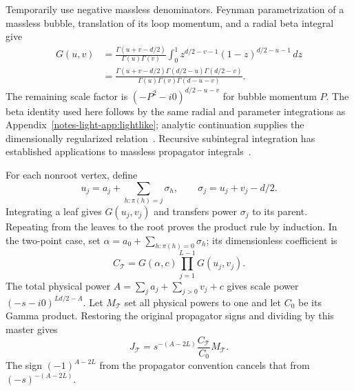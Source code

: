 \documentclass[11pt,a4paper]{article}
\begin{document}
Temporarily use negative massless denominators. Feynman parametrization of a massless bubble, translation of its loop momentum, and a radial beta integral give
\begin{align}
 G(u,v)&=\frac{\Gamma(u+v-d/2)}{\Gamma(u)\Gamma(v)}
 \int_0^1z^{d/2-v-1}(1-z)^{d/2-u-1}\,dz\nonumber\\
 &=\frac{\Gamma(u+v-d/2)\Gamma(d/2-u)\Gamma(d/2-v)}
 {\Gamma(u)\Gamma(v)\Gamma(d-u-v)}.
 \label{notes-direct-eq:tree-bubble}
\end{align}
The remaining scale factor is $(-P^2-i0)^{d/2-u-v}$ for bubble momentum $P$. The beta identity used here follows by the same radial and parameter integrations as Appendix~\ref{notes-light-app:lightlike}; analytic continuation supplies the dimensionally regularized relation~\cite{Weinzierl2022}. Recursive subintegral integration has established applications to massless propagator integrals~\cite{Ruijl2017Forcer}.

For each nonroot vertex, define
\begin{equation}
 u_j=a_j+\sum_{h:\pi(h)=j}\sigma_h,\qquad
 \sigma_j=u_j+v_j-d/2.
 \label{notes-direct-eq:tree-transfer}
\end{equation}
Integrating a leaf gives $G(u_j,v_j)$ and transfers power $\sigma_j$ to its parent. Repeating from the leaves to the root proves the product rule by induction. In the two-point case, set $\alpha=a_0+\sum_{h:\pi(h)=0}\sigma_h$; its dimensionless coefficient is
\begin{equation}
 C_{\mathcal T}=G(\alpha,c)\prod_{j=1}^{L-1}G(u_j,v_j).
 \label{notes-direct-eq:tree-coefficient}
\end{equation}
The total physical power $A=\sum_j a_j+\sum_{j>0}v_j+c$ gives scale power $(-s-i0)^{Ld/2-A}$. Let $M_{\mathcal T}$ set all physical powers to one and let $C_0$ be its Gamma product. Restoring the original propagator signs and dividing by this master gives
\begin{equation}
 J_{\mathcal T}=s^{-(A-2L)}\frac{C_{\mathcal T}}{C_0}M_{\mathcal T}.
 \label{notes-direct-eq:tree-ratio}
\end{equation}
The sign $(-1)^{A-2L}$ from the propagator convention cancels that from $(-s)^{-(A-2L)}$.
\end{document}
